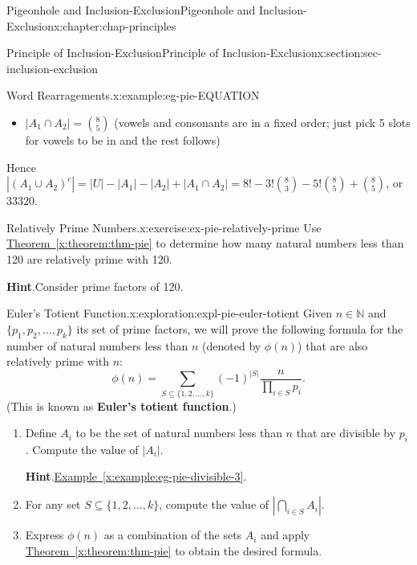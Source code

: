 \documentclass[oneside,10pt,]{book}
\newcommand{\blocktitlefont}{\relax}
\newcommand{\xreffont}{\relax}
\newcommand{\terminology}[1]{\textbf{#1}}
\numberwithin{equation}{section}
\begin{document}
\begin{chapterptx}{Pigeonhole and Inclusion-Exclusion}{}{Pigeonhole and Inclusion-Exclusion}{}{}{x:chapter:chap-principles}
\begin{sectionptx}{Principle of Inclusion-Exclusion}{}{Principle of Inclusion-Exclusion}{}{}{x:section:sec-inclusion-exclusion}
\begin{example}{Word Rearragements.}{x:example:eg-pie-EQUATION}
\begin{itemize}[label=\textbullet]
\item{}\(|A_1 \cap A_2| = \binom{8}{5}\) (vowels and consonants are in a fixed order; just pick 5 slots for vowels to be in and the rest follows)%
\end{itemize}
%
\par
Hence \(|(A_1 \cup A_2)^c| = |U| - |A_1| - |A_2| + |A_1 \cap A_2| = 8! - 3!\binom{8}{3} - 5!\binom{8}{5} + \binom{8}{5}\), or 33320.%
\end{example}
\begin{inlineexercise}{Relatively Prime Numbers.}{x:exercise:ex-pie-relatively-prime}%
Use \hyperref[x:theorem:thm-pie]{Theorem~{\xreffont\ref{x:theorem:thm-pie}}} to determine how many natural numbers less than 120 are relatively prime with 120.%
\par\smallskip%
\noindent\textbf{\blocktitlefont Hint}.\hypertarget{g:hint:id467256}{}\quad{}Consider prime factors of 120.%
\end{inlineexercise}
\begin{exploration}{Euler's Totient Function.}{x:exploration:expl-pie-euler-totient}%
Given \(n \in \mathbb{N}\) and \(\{p_1,p_2,\ldots,p_k\}\) its set of prime factors, we will prove the following formula for the number of natural numbers less than \(n\) (denoted by \(\phi(n)\)) that are also relatively prime with \(n\):%
\begin{equation*}
\phi(n) = \sum_{S \subseteq \{1,2,\ldots,k\}}(-1)^{|S|}\dfrac{n}{\prod_{i\in S} p_i}\text{.}
\end{equation*}
(This is known as \terminology{Euler's totient function}.)%
\begin{enumerate}[font=\bfseries,label=(\alph*),ref=\alph*]
\item{}Define \(A_i\) to be the set of natural numbers less than \(n\) that are divisible by \(p_i\). Compute the value of \(|A_i|\).%
\par\smallskip%
\noindent\textbf{\blocktitlefont Hint}.\hypertarget{g:hint:id467503}{}\quad{}\hyperref[x:example:eg-pie-divisible-3]{Example~{\xreffont\ref{x:example:eg-pie-divisible-3}}}.%
\item{}For any set \(S \subseteq \{1,2,\ldots,k\}\), compute the value of \(\left|\displaystyle\bigcap_{i\in S} A_i \right|\).%
\item{}Express \(\phi(n)\) as a combination of the sets \(A_i\) and apply \hyperref[x:theorem:thm-pie]{Theorem~{\xreffont\ref{x:theorem:thm-pie}}} to obtain the desired formula.%
\end{enumerate}
\end{exploration}

\end{sectionptx}
\end{chapterptx}
\end{document}
